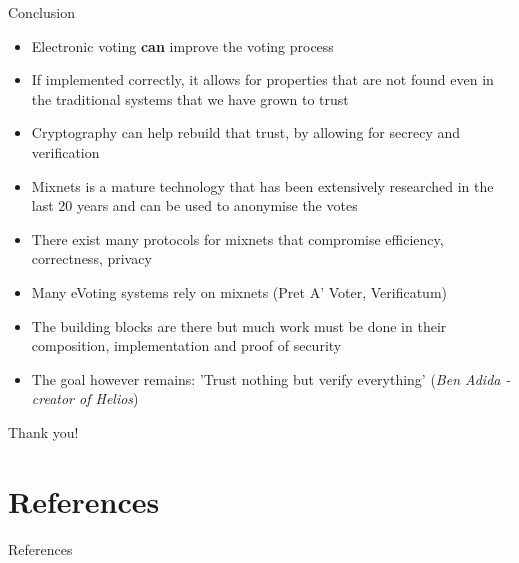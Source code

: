 \documentclass{beamer}
\newcommand*{\addsp}{\usebeamertemplate*{section page1}}
\begin{document}
\begin{frame}{Conclusion}
\begin{itemize}
\item Electronic voting \textbf{can} improve the voting process 
\item If implemented correctly, it allows for properties that are not found even in the traditional systems that we have grown to trust
\item Cryptography can help rebuild that trust, by allowing for secrecy and verification 
\item Mixnets is a mature technology that has been extensively researched in the last 20 years and can be used to anonymise the votes
\item There exist many protocols for mixnets that compromise efficiency, correctness, privacy
\item Many eVoting systems rely on mixnets (Pret A' Voter, Verificatum)
\item The building blocks are there but much work must be done in their composition, implementation and proof of security
\item The goal however remains: 'Trust nothing but verify everything' (\textit{Ben Adida - creator of Helios})
\end{itemize}

\begin{center}
\begin{Huge}
Thank you!
\end{Huge}
\end{center}

\end{frame}

\section{References}
\begin{frame}
\addsp
\end{frame}

\begin{frame}[allowframebreaks]{References}
\begin{tiny}


\end{tiny}
\nocite{*}
\end{frame}

 
\end{document}

